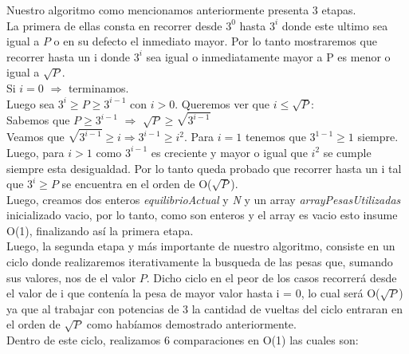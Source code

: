 
Nuestro algoritmo como mencionamos anteriormente presenta 3 etapas.\\
La primera de ellas consta en recorrer desde $3^0$ hasta $3^i$ donde este ultimo sea igual a $P$ o en su defecto el inmediato mayor. Por lo tanto mostraremos que recorrer hasta un i donde $3^i$ sea igual o inmediatamente mayor a P es menor o igual a $\sqrt{P}$.\\


Si $i = 0$ $\Rightarrow$ terminamos.\\
Luego sea $3^i \geq P \geq 3^{i-1}$ con $i > 0$. Queremos ver que $i \leq \sqrt{P}$:\\
Sabemos que $P \geq 3^{i-1}$ $\Rightarrow$ $\sqrt{P} \geq \sqrt{3^{i-1}}$\\
Veamos que $\sqrt{3^{i-1}} \geq i \Rightarrow 3^{i-1} \geq {i^2}$. Para $i = 1$ tenemos que $3^{1-1} \geq 1$ siempre. Luego, para $i > 1$ como ${3^{i-1}}$ es creciente y mayor o igual que $i^2$ se cumple siempre esta desigualdad. Por lo tanto queda probado que recorrer hasta un i tal que $3^i \geq P$ se encuentra en el orden de  O($\sqrt{P}$).\\


 Luego, creamos dos enteros \textit{equilibrioActual} y \textit{N} y un array \textit{arrayPesasUtilizadas} inicializado vacio, por lo tanto, como son enteros y el array es vacio esto insume O(1), finalizando as\'i la primera etapa.\\
Luego, la segunda etapa y m\'as importante de nuestro algoritmo, consiste en un ciclo donde realizaremos iterativamente la busqueda de las pesas que, sumando sus valores, nos de el valor $P$. Dicho ciclo en el peor de los casos recorrer\'a desde el valor de i que conten\'ia la pesa de mayor valor hasta i = 0, lo cual ser\'a O($\sqrt{P}$) ya que al trabajar con potencias de 3 la cantidad de vueltas del ciclo entraran en el orden de $\sqrt{P}$ como hab\'iamos demostrado anteriormente.\\ 

Dentro de este ciclo, realizamos 6 comparaciones en O(1) las cuales son:

